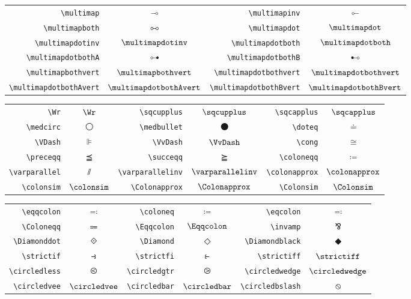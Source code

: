 \documentclass[a4paper,11pt]{christophe}
\begin{document}
\begin{center}\begin{tabular}{r>{$}c<{$}|r>{$}c<{$}}

\verb=\multimap=&\multimap&\verb=\multimapinv=&\multimapinv\\
\verb=\multimapboth=&\multimapboth&\verb=\multimapdot=&\multimapdot\\
\verb=\multimapdotinv=&\multimapdotinv&\verb=\multimapdotboth=&\multimapdotboth\\
\verb=\multimapdotbothA=&\multimapdotbothA&\verb=\multimapdotbothB=&\multimapdotbothB\\
\verb=\multimapbothvert=&\multimapbothvert&\verb=\multimapdotbothvert=&\multimapdotbothvert\\
\verb=\multimapdotbothAvert=&\multimapdotbothAvert&\verb=\multimapdotbothBvert=&\multimapdotbothBvert\\

\end{tabular}\end{center}

\begin{center}\begin{tabular}{r>{$}c<{$}|r>{$}c<{$}|r>{$}c<{$}}

\verb=\Wr=&\Wr&\verb=\sqcupplus=&\sqcupplus&\verb=\sqcapplus=&\sqcapplus\\
\verb=\medcirc=&\medcirc&\verb=\medbullet=&\medbullet&\verb=\doteq=&\doteq\\
\verb=\VDash=&\VDash&\verb=\VvDash=&\VvDash&
\verb=\cong=&\cong\\
\verb=\preceqq=&\preceqq&
\verb=\succeqq=&\succeqq&\verb=\coloneqq=&\coloneqq\\
\verb=\varparallel=&\varparallel&\verb=\varparallelinv=&\varparallelinv&\verb=\colonapprox=&\colonapprox\\
\verb=\colonsim=&\colonsim&\verb=\Colonapprox=&\Colonapprox&\verb=\Colonsim=&\Colonsim\\

\end{tabular}\end{center}

\begin{center}\begin{tabular}{r>{$}c<{$}|r>{$}c<{$}|r>{$}c<{$}}

\verb=\eqqcolon=&\eqqcolon&\verb=\coloneq=&\coloneq&\verb=\eqcolon=&\eqcolon\\
\verb=\Coloneqq=&\Coloneqq&
\verb=\Eqqcolon=&\Eqqcolon&\verb=\invamp=&\invamp\\
\verb=\Diamonddot=&\Diamonddot&\verb=\Diamond=&\Diamond&\verb=\Diamondblack=&\Diamondblack\\
\verb=\strictif=&\strictif&\verb=\strictfi=&\strictfi&\verb=\strictiff=&\strictiff\\
\verb=\circledless=&\circledless&\verb=\circledgtr=&\circledgtr&\verb=\circledwedge=&\circledwedge\\
\verb=\circledvee=&\circledvee&\verb=\circledbar=&\circledbar&\verb=\circledbslash=&\circledbslash

\end{tabular}\end{center}
\end{document}
